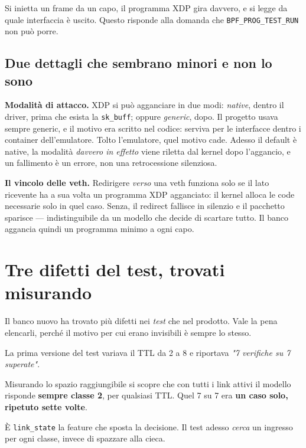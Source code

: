 \documentclass[11pt,a4paper,oneside]{report}
\begin{document}
Si inietta un frame da un capo, il programma XDP gira davvero, e si legge da
quale interfaccia è uscito. Questo risponde alla domanda che
\texttt{BPF\_PROG\_TEST\_RUN} non può porre.

\subsection*{Due dettagli che sembrano minori e non lo sono}

\textbf{Modalità di attacco.} XDP si può agganciare in due modi: \emph{native},
dentro il driver, prima che esista la \texttt{sk\_buff}; oppure \emph{generic},
dopo. Il progetto usava sempre generic, e il motivo era scritto nel codice:
serviva per le interfacce dentro i container dell'emulatore. Tolto l'emulatore,
quel motivo cade. Adesso il default è native, la modalità \emph{davvero in
effetto} viene riletta dal kernel dopo l'aggancio, e un fallimento è un errore,
non una retrocessione silenziosa.

\textbf{Il vincolo delle veth.} Redirigere \emph{verso} una veth funziona solo
se il lato ricevente ha a sua volta un programma XDP agganciato: il kernel
alloca le code necessarie solo in quel caso. Senza, il redirect fallisce in
silenzio e il pacchetto sparisce --- indistinguibile da un modello che decide di
scartare tutto. Il banco aggancia quindi un programma minimo a ogni capo.

\section{Tre difetti del test, trovati misurando}

Il banco nuovo ha trovato più difetti nei \emph{test} che nel prodotto. Vale la
pena elencarli, perché il motivo per cui erano invisibili è sempre lo stesso.

\begin{prima}
La prima versione del test variava il TTL da 2 a 8 e riportava
\emph{"7 verifiche su 7 superate"}.

Misurando lo spazio raggiungibile si scopre che con tutti i link attivi il
modello risponde \textbf{sempre classe 2}, per qualsiasi TTL. Quel 7 su 7 era
\textbf{un caso solo, ripetuto sette volte}.

È \texttt{link\_state} la feature che sposta la decisione. Il test adesso
\emph{cerca} un ingresso per ogni classe, invece di spazzare alla cieca.
\end{prima}
\end{document}
